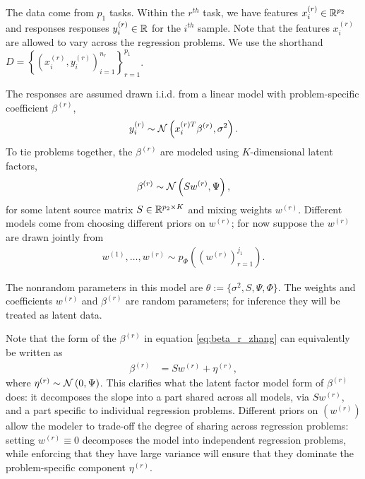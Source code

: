 \documentclass[14pt]{extarticle}
\begin{document}
The data come from $p_{1}$ tasks. Within the $r^{th}$ task, we have features
$x_{i}^{(r)} \in \mathbb{R}^{p_{2}}$ and responses responses $y_{i}^{(r)} \in
\mathbb{R}$ for the $i^{th}$ sample. Note that the features $x_{i}^{(r)}$ are
allowed to vary across the regression problems. We use the shorthand $D =
\left\{\left(x_{i}^{(r)}, y_i^{(r)}\right)_{i = 1}^{n_{r}}\right\}_{r =
  1}^{p_{1}}$.

The responses are assumed drawn i.i.d. from a linear model with problem-specific
coefficient $\beta^{(r)}$,
\begin{align*}
  y_{i}^{(r)} \sim \mathcal{N}\left(x_{i}^{(r) T}\beta^{(r)}, \sigma^{2}\right).
\end{align*}
To tie problems together, the $\beta^{(r)}$ are modeled using $K$-dimensional
latent factors,
\begin{align}
  \beta^{(r)} \sim \mathcal{N}\left(S w^{(r)}, \Psi\right), \label{eq:beta_r_zhang}
\end{align}
for some latent source matrix $S \in \mathbb{R}^{p_{2} \times K}$ and mixing weights
$w^{(r)}$. Different models come from choosing different priors on $w^{(r)}$;
for now suppose the $w^{(r)}$ are drawn jointly from
\begin{align*}
w^{(1)}, \dots, w^{(r)} \sim  p_{\Phi}\left(\left(w^{\left(r\right)}\right)_{r = 1}^{j_{1}}\right).
\end{align*}

The nonrandom parameters in this model are $\theta := \{\sigma^{2}, S, \Psi,
\Phi\}$. The weights and coefficients $w^{(r)}$ and $\beta^{(r)}$ are random
parameters; for inference they will be treated as latent data.

Note that the form of the $\beta^{(r)}$ in equation \ref{eq:beta_r_zhang} can
equivalently be written as
\begin{align*}
\beta^{(r)} &= Sw^{(r)} + \eta^{(r)},
\end{align*}
where $\eta^{(r)} \sim \mathcal{N}\left(0, \Psi\right)$. This clarifies what the latent
factor model form of $\beta^{(r)}$ does: it decomposes the slope into a part
shared across all models, via $Sw^{(r)}$, and a part specific to individual
regression problems. Different priors on $\left(w^{(r)}\right)$ allow the
modeler to trade-off the degree of sharing across regression problems: setting
$w^{(r)} \equiv 0$ decomposes the model into independent regression problems,
while enforcing that they have large variance will ensure that they dominate the
problem-specific component $\eta^{(r)}$.
\end{document}
